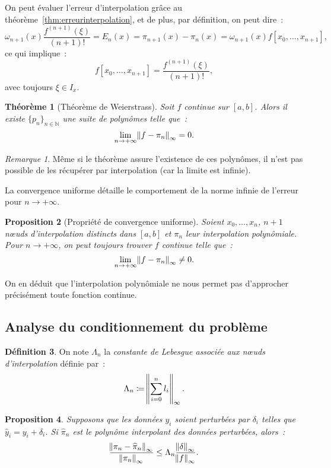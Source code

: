 \documentclass{article}
\newtheorem{thm}{Théorème}[section]
\newtheorem{prp}[thm]{Proposition}
\theoremstyle{definition}
\newtheorem{déf}[thm]{Définition}
\theoremstyle{remark}
\newtheorem*{rmq}{Remarque}
\newcommand{\N}{\mathbb N}
\begin{document}
		On peut évaluer l'erreur d'interpolation grâce au théorème~\ref{thm:erreurinterpolation}, et de plus, par définition, on peut dire~:
		\[\omega_{n+1}(x)\frac {f^{(n+1)}(\xi)}{(n+1)!} = E_n(x) = \pi_{n+1}(x) - \pi_n(x) = \omega_{n+1}(x)f[x_0, \dotsc, x_{n+1}],\]
		ce qui implique~:
		\[f[x_0, \dotsc, x_{n+1}] = \frac {f^{(n+1)}(\xi)}{(n+1)!},\]
		avec toujours $\xi \in I_x$.

		\begin{thm}[Théorème de Weierstrass] Soit $f$ continue sur $[a, b]$. Alors il existe $\{p_n\}_{n \in \N}$ une suite de polynômes telle que~:
		\[\lim_{n \to +\infty}\norm{f-\pi_n}_\infty = 0.\]
		\end{thm}

		\begin{rmq} Même si le théorème assure l'existence de ces polynômes, il n'est pas possible de les récupérer par interpolation (car la limite est infinie).
		\end{rmq}

		La convergence uniforme détaille le comportement de la norme infinie de l'erreur pour $n \to +\infty$.

		\begin{prp}[Propriété de convergence uniforme] Soient $x_0, \dotsc, x_n$, $n+1$ nœuds d'interpolation distincts dans $[a, b]$ et $\pi_n$
		leur interpolation polynômiale. Pour $n \to +\infty$, on peut toujours trouver $f$ continue telle que~:
		\[\lim_{n \to +\infty}\norm{f-\pi_n}_\infty \neq 0.\]
		\end{prp}

		On en déduit que l'interpolation polynômiale ne nous permet pas d'approcher précisément toute fonction continue.

	\subsection{Analyse du conditionnement du problème}
		\begin{déf} On note $\Lambda_n$ la \emph{constante de Lebesgue associée aux nœuds d'interpolation} définie par~:
		\[\Lambda_n \coloneqq \norm {\sum_{i=0}^nl_i}_\infty.\]
		\end{déf}

		\begin{prp} Supposons que les données $y_i$ soient perturbées par $\delta_i$ telles que $\widehat y_i = y_i + \delta_i$. Si $\widehat \pi_n$ est le
		polynôme interpolant des données perturbées, alors~:
		\[\frac {\norm {\pi_n - \widehat \pi_n}_\infty}{\norm {\pi_n}_\infty} \leq \Lambda_n\frac {\norm \delta_\infty}{\norm f_\infty}.\]
		\end{prp}
\end{document}
